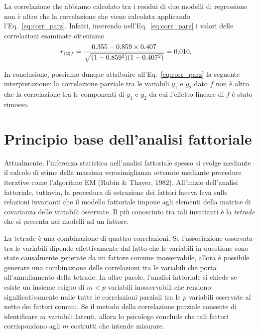 La correlazione che abbiamo calcolato tra i residui di due modelli di regressione non è altro che la correlazione che viene calcolata applicando l'Eq.~\ref{eq:corr_parz}.  
Infatti, inserendo nell'Eq.~\ref{eq:corr_parz} i valori delle correlazioni esaminate  otteniamo
\begin{align}
  r_{12 \mid f} &= \frac{0.355 - 0.859 \times 0.407 }
  {\sqrt{(1-0.859^2)(1-0.407^2)}}= 0.010. \notag
\end{align}

In conclusione, possiamo dunque attribuire all'Eq.~\ref{eq:corr_parz} la seguente interpretazione: la correlazione parziale tra le variabili $y_1$ e $y_2$ dato $f$ non è altro che la correlazione tra le componenti di $y_1$ e $y_2$ da cui l'effetto lineare di $f$ è stato rimosso.


\section{Principio base dell'analisi fattoriale}

Attualmente, l'inferenza statistica nell'analisi fattoriale spesso si svolge mediante il calcolo di stime della massima verosimiglianza ottenute mediante procedure iterative come l'algoritmo EM (Rubin \& Thayer, 1982). 
All'inizio dell'analisi fattoriale, tuttavia, la procedura di estrazione dei fattori faceva leva sulle relazioni invarianti che il modello fattoriale impone agli elementi della matrice di covarianza delle variabili osservate.
Il più conosciuto tra tali invarianti è la \emph{tetrade} che si presenta nei modelli ad un fattore.

La tetrade è una combinazione di quattro correlazioni. 
Se l'associazione osservata tra le variabili dipende effettivamente dal fatto che le  variabili in questione sono state causalmente generate da un fattore comune inosservabile, allora è possibile generare una combinazione delle correlazioni tra le variabili che porta all'annullamento della tetrade. 
In altre parole, l'analisi fattoriale si chiede se esiste un insieme esiguo di $m<p$ variabili inosservabili che rendono significativamente nulle tutte le correlazioni parziali tra le $p$ variabili osservate al netto dei fattori comuni.
Se il metodo della correlazione parziale consente di identificare $m$ variabili latenti, allora lo psicologo conclude che tali fattori corrispondono agli $m$ costrutti che intende misurare.

